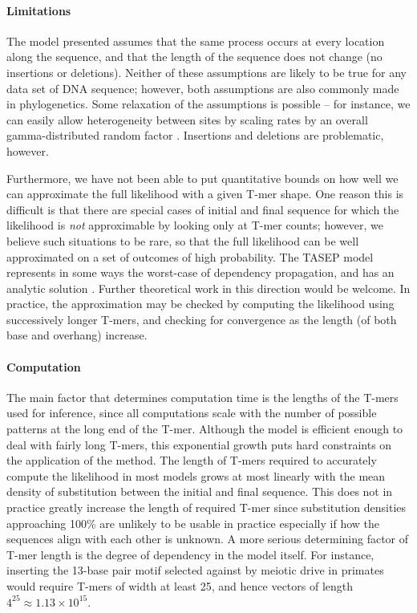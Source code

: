 \documentclass{article}
\theoremstyle{plain}
\theoremstyle{definition}
\begin{document}
\paragraph{Limitations}
The model presented assumes that the same process occurs at every location along the sequence,
and that the length of the sequence does not change (no insertions or deletions).
Neither of these assumptions are likely to be true for any data set of DNA sequence;
however, both assumptions are also commonly made in phylogenetics.
Some relaxation of the assumptions is possible -- for instance,
we can easily allow heterogeneity between sites by scaling rates by an overall gamma-distributed random factor \citep{yang1994maximum}.
Insertions and deletions are problematic, however.

Furthermore, we have not been able to put
quantitative bounds on how well we can approximate the full likelihood
with a given T-mer shape.
One reason this is difficult is that there are special cases of initial and final sequence
for which the likelihood is \emph{not} approximable by looking only at T-mer counts;
however, we believe such situations to be rare,
so that the full likelihood can be well approximated on a set of outcomes of high probability.
The TASEP model represents in some ways the worst-case of dependency propagation,
and has an analytic solution \citep{schutz1997exact}.
Further theoretical work in this direction would be welcome.
In practice,
the approximation may be checked by computing the likelihood
using successively longer T-mers,
and checking for convergence as the length (of both base and overhang) increase.


\paragraph{Computation}
The main factor that determines computation time
is the lengths of the T-mers used for inference,
since all computations scale with the number of possible patterns at the long end of the T-mer.
Although the model is efficient enough to deal with fairly long T-mers,
this exponential growth puts hard constraints on the application of the method.
The length of T-mers required to accurately compute the likelihood in most models grows at most linearly
with the mean density of substitution between the initial and final sequence.
This does not in practice greatly increase the length of required T-mer
since substitution densities approaching 100\% are unlikely to be usable in practice
especially if how the sequences align with each other is unknown.
A more serious determining factor of T-mer length is the degree of dependency in the model itself.
For instance, inserting the 13-base pair motif selected against by meiotic drive in primates \citep{myers2010drive}
would require T-mers of width at least 25, and hence vectors of length $4^{25} \approx 1.13 \times 10^{15}$.
\end{document}

